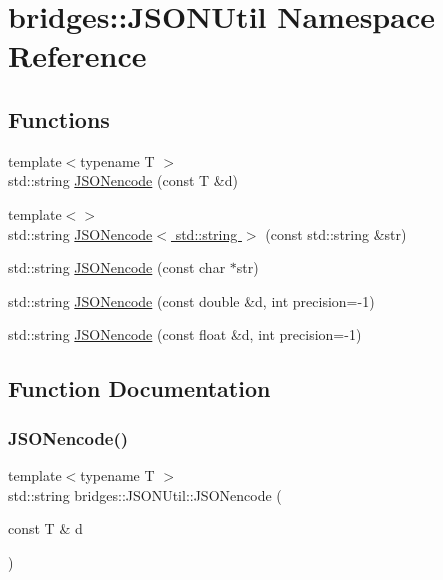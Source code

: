 \hypertarget{namespacebridges_1_1_j_s_o_n_util}{}\section{bridges\+:\+:J\+S\+O\+N\+Util Namespace Reference}
\label{namespacebridges_1_1_j_s_o_n_util}
\subsection*{Functions}
\begin{DoxyCompactItemize}
\item 
{\footnotesize template$<$typename T $>$ }\\std\+::string \hyperlink{namespacebridges_1_1_j_s_o_n_util_a8510af8bef5b7bf4062d6f25eceb20b4}{J\+S\+O\+Nencode} (const T \&d)
\item 
{\footnotesize template$<$$>$ }\\std\+::string \hyperlink{namespacebridges_1_1_j_s_o_n_util_a8db4f538e31bd8369e51a46802708f3d}{J\+S\+O\+Nencode$<$ std\+::string $>$} (const std\+::string \&str)
\item 
std\+::string \hyperlink{namespacebridges_1_1_j_s_o_n_util_a6a5122ccf58c08737d70437267674799}{J\+S\+O\+Nencode} (const char $\ast$str)
\item 
std\+::string \hyperlink{namespacebridges_1_1_j_s_o_n_util_aa98c84a92a032c2ab78dbc087d0a0754}{J\+S\+O\+Nencode} (const double \&d, int precision=-\/1)
\item 
std\+::string \hyperlink{namespacebridges_1_1_j_s_o_n_util_a661209c42479be511132855fac24cd08}{J\+S\+O\+Nencode} (const float \&d, int precision=-\/1)
\end{DoxyCompactItemize}


\subsection{Function Documentation}
\mbox{\label{namespacebridges_1_1_j_s_o_n_util_a8510af8bef5b7bf4062d6f25eceb20b4}} 
\subsubsection{\texorpdfstring{J\+S\+O\+Nencode()}{JSONencode()}\hspace{0.1cm}{\footnotesize\ttfamily [1/4]}}
{\footnotesize\ttfamily template$<$typename T $>$ \\
std\+::string bridges\+::\+J\+S\+O\+N\+Util\+::\+J\+S\+O\+Nencode (\begin{DoxyParamCaption}\item[{const T \&}]{d }\end{DoxyParamCaption})\hspace{0.3cm}{\ttfamily [inline]}}


